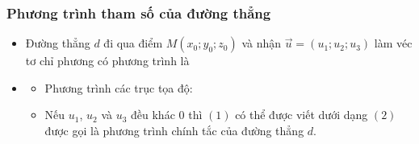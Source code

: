 \subsubsection{Phương trình tham số của đường thẳng}
\begin{itemize}
	\item [\iconMT]  Đường thẳng $d$ đi qua điểm $M(x_0;y_0;z_0)$ và nhận $\vec{u}=(u_1;u_2;u_3)$ làm véc tơ chỉ phương có phương trình là 
	\item [\iconMT] 
	\begin{boxdn}
		\begin{itemize}
			\item [\ding{172}] Phương trình các trục tọa độ: 
			\item [\ding{173}] Nếu $u_1$, $u_2$ và $u_3$ đều khác $0$ thì $(1)$ có thể được viết dưới dạng
			$(2)$ được gọi là phương trình chính tắc của đường thẳng $d$.
		\end{itemize}
	\end{boxdn}
\end{itemize}
